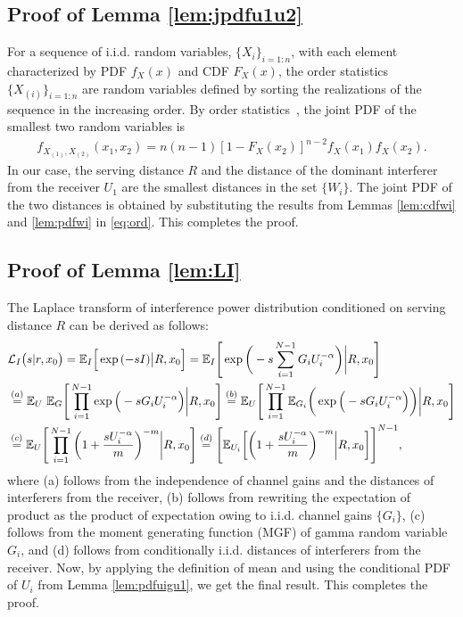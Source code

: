 \documentclass[journal,draftclsnofoot,onecolumn,12pt]{IEEEtran}
\begin{document}
\subsection{Proof of Lemma \ref{lem:jpdfu1u2}}\label{app:jpdfu1u2}
For a sequence of i.i.d. random variables, $\{X_i\}_{i=1:n}$, with each element characterized by PDF $f_X(x)$ and CDF $F_X(x)$, the order statistics $\{X_{(i)}\}_{i=1:n}$ are random variables defined by sorting the realizations of the sequence in the increasing order. By order statistics~\cite{ahsanullah2005order}, the joint PDF of the smallest two random variables is 
\begin{align}\label{eq:ord}
f_{X_{(1)},X_{(2)}}(x_1,x_2) = n(n-1)[1-F_X(x_2)]^{n-2}f_X(x_1)f_X(x_2).
\end{align}
In our case, the serving distance $R$ and the distance of the dominant interferer from the receiver $U_1$ are the smallest distances in the set $\{W_i\}$. The joint PDF of the two distances is obtained by substituting the results from Lemmas \ref{lem:cdfwi} and \ref{lem:pdfwi} in \eqref{eq:ord}. This completes the proof. 
\subsection{Proof of Lemma \ref{lem:LI}}\label{app:LI}
The Laplace transform of interference power distribution conditioned on serving distance $R$ can be derived as follows:
\begin{align}\notag
&\mathcal{L}_I\big(s | r, x_0\big) = {\mathbb{E}}_I \Big[ \exp{(-sI)} \big| R, x_0 \Big] = {\mathbb{E}}_I\Bigg[ \exp\bigg(-s \sum_{i=1}^{N-1} G_i U_i^{-\alpha} \bigg) \bigg| R, x_0 \Bigg] \\ \notag
&\stackrel{(a)}{=} {\mathbb{E}}_U \ {\mathbb{E}}_G \Bigg[ \prod_{i=1}^{N-1} \exp \Big( -s G_i U_i^{-\alpha} \Big)\bigg| R, x_0 \Bigg] \stackrel{(b)}{=} {\mathbb{E}}_U  \Bigg[ \prod_{i=1}^{N-1} {\mathbb{E}}_{G_i} \bigg( \exp \Big( -s G_i U_i^{-\alpha}  \Big) \bigg) \bigg| R, x_0 \Bigg] \\ \label{equ:pcm1}
&\stackrel{(c)}{=} {\mathbb{E}}_U \Bigg[ \prod_{i=1}^{N-1} \bigg(1 + \frac{s U_i^{-\alpha}}{m} \bigg)^{-m} \bigg| R, x_0 \Bigg] \stackrel{(d)}{=} \Bigg[ {\mathbb{E}}_{U_i}\bigg[ \bigg(1 + \frac{s U_i^{-\alpha}}{m} \bigg)^{-m} \bigg| R, x_0 \bigg] \Bigg]^{N-1},
\end{align}
where (a) follows from the independence of channel gains and the distances of interferers from the receiver, (b) follows from rewriting the expectation of product as the product of expectation owing to i.i.d. channel gains $\{G_i\}$, (c) follows from the moment generating function (MGF) of gamma random variable $G_i$, and (d) follows from conditionally i.i.d. distances of interferers from the receiver. Now, by applying the definition of mean and using the conditional PDF of $U_i$ from Lemma \ref{lem:pdfuigu1}, we get the final result. This completes the proof.
\end{document}
